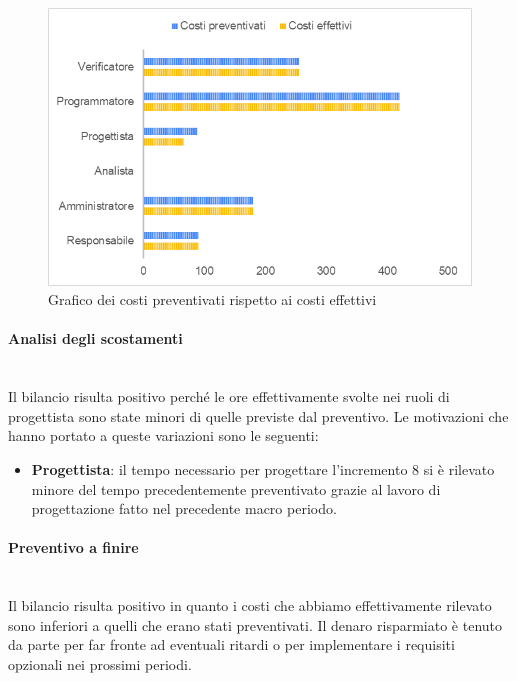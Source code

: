 \begin{figure} [H]
	\includegraphics[width=\linewidth]{./img/Grafici/ra-consuntivo4.png}
	\caption{Grafico dei costi preventivati rispetto ai costi effettivi}
\end{figure}

\paragraph*{Analisi degli scostamenti} \mbox{} \\
Il bilancio risulta positivo perché le ore effettivamente svolte nei ruoli di progettista sono state minori di quelle previste dal preventivo.
Le motivazioni che hanno portato a queste variazioni sono le seguenti:
\begin{itemize}
	\item \textbf{Progettista}: il tempo necessario per progettare l'incremento 8 si è rilevato minore del tempo precedentemente preventivato grazie al lavoro di progettazione fatto nel precedente macro periodo.
\end{itemize}

\paragraph*{Preventivo a finire} \mbox{} \\
Il bilancio risulta positivo in quanto i costi che abbiamo effettivamente rilevato sono inferiori a quelli che erano stati preventivati. Il denaro risparmiato è tenuto da parte per far fronte ad eventuali ritardi o per implementare i requisiti opzionali nei prossimi periodi.


